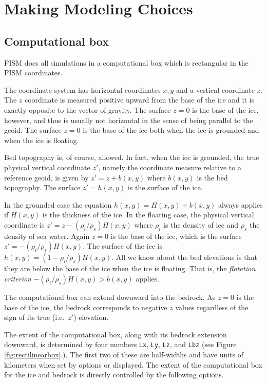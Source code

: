 
\section{Making Modeling Choices}
\label{sec:modeling-choices}

\subsection{Computational box} \label{subsect:coords}

PISM does all simulations in a computational box which is rectangular in the PISM coordinates.

The coordinate system has horizontal coordinates $x,y$ and a vertical coordinate $z$.  The $z$ coordinate is measured positive upward from the base of the ice and it is exactly opposite to the vector of gravity.  The surface $z=0$ is the base of the ice, however, and thus is usually not horizontal in the sense of being parallel to the geoid.   The surface $z=0$ is the base of the ice both when the ice is grounded and when the ice is floating.

Bed topography is, of course, allowed.  In fact, when the ice is grounded, the true physical vertical coordinate $z'$, namely the coordinate measure relative to a reference geoid, is given by $z'=z+b(x,y)$ where $b(x,y)$ is the bed topography.  The surface $z'=h(x,y)$ is the surface of the ice.

In the grounded case the equation $h(x,y)=H(x,y)+b(x,y)$ always applies if $H(x,y)$ is the thickness of the ice.  In the floating case, the physical vertical coordinate is $z'=z-(\rho_i/\rho_s) H(x,y)$ where $\rho_i$ is the density of ice and $\rho_s$ the density of sea water.  Again $z=0$ is the base of the ice, which is the surface $z' = -(\rho_i/\rho_s) H(x,y)$.  The surface of the ice is $h(x,y) = (1-\rho_i/\rho_s) H(x,y)$.  All we know about the bed elevations is that they are below the base of the ice when the ice is floating.  That is, the \emph{flotation criterion} $-(\rho_i/\rho_s) H(x,y) > b(x,y)$ applies.

The computational box can extend downward into the bedrock.  As $z=0$ is the base of the ice, the bedrock corresponds to negative $z$ values regardless of the sign of its true (i.e.~$z'$) elevation.

The extent of the computational box, along with its bedrock extension downward, is determined by four numbers \texttt{Lx}, \texttt{Ly}, \texttt{Lz}, and \texttt{Lbz} (see Figure \ref{fig:rectilinearbox}.).  The first two of these are half-widths and have units of kilometers when set by options or displayed.  The extent of the computational box for the ice and bedrock is directly controlled by the following options. 

